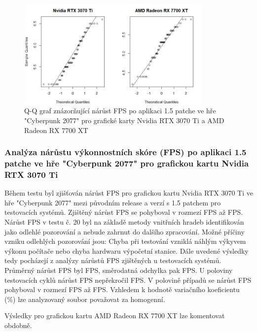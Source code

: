 \begin{figure}[h!]
    \centering
    \includegraphics[width=0.85\textwidth]{assets/qq}
    \caption{Q-Q graf znázorňující nárůst FPS po aplikaci 1.5 patche ve hře "Cyberpunk 2077" pro grafické karty Nvidia RTX 3070 Ti a AMD Radeon RX 7700 XT}
    \label{fig:qq}
\end{figure}

\newpage
\subsubsection*{Analýza nárůstu výkonnostních skóre (FPS) po aplikaci 1.5 patche ve hře "Cyberpunk 2077" pro grafickou kartu Nvidia RTX 3070 Ti}

Během testu byl zjišťován nárůst FPS pro grafickou kartu Nvidia RTX 3070 Ti ve hře "Cyberpunk 2077" mezi původním release a verzí s 1.5 patchem
pro  testovacích systémů. Zjištěný nárůst FPS se pohyboval v rozmezí  FPS
až  FPS. Nárůst FPS v testu č. 20 byl na základě metody vnitřních hradeb identifikován jako odlehlé pozorování
a nebude zahrnut do dalšího zpracování. Možné příčiny vzniku odlehlých pozorování jsou: Chyba při testování vzniklá náhlým výkyvem výkonu počítače
nebo chyba hardwaru výpočetní stanice. Dále uvedené výsledky tedy pocházejí z analýzy nárůstů FPS zjištěných u 
testovacích systémů. Průměrný nárůst FPS byl  FPS, směrodatná odchylka pak  FPS\@.
U poloviny testovacích cyklů nárůst FPS nepřekročil  FPS. V polovině případů se nárůst FPS pohyboval v
rozmezí  FPS až  FPS. Vzhledem k hodnotě variačního koeficientu (\mbox{}\%)
lze analyzovaný soubor považovat za homogenní.

\vspace{1em}
\noindent
Výsledky pro grafickou kartu AMD Radeon RX 7700 XT lze komentovat obdobně.


